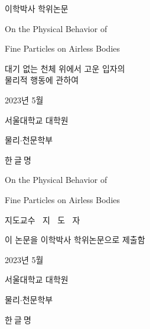 \def\tTitleA{{On the Physical Behavior of}}
\def\tTitleB{{Fine Particles on Airless Bodies}}
\def\tTitleK{{대기 없는 천체 위에서 고운 입자의 \\물리적 행동에 관하여}}
\def\tDepartment{{물리$\cdot$천문학부}}
\def\tDate{{2023년 5월}}
\def\tName{{한글명}}
\def\tNameWithBlank{{한$ \ $글$ \ $명}}

\renewcommand{\baselinestretch}{1}
\centering
{\Large \quad \par}
\vspace{.5cm}
{\Large 이학박사 학위논문 \par}
\vspace{2cm}
{\Huge \tTitleA \par}
\vspace{.3cm}
{\Huge \tTitleB \par}
\vspace{2cm}
{\LARGE \tTitleK \par}
\vspace{4.5cm}
{\Large \tDate \par}
\vspace{3cm}
{\LARGE 서울대학교 대학원 \par}
\vspace{.5cm}
{\Large \tDepartment \par}
\vspace{.5cm}
{\LARGE \tNameWithBlank \par}

\clearpage

\centering
{\Large \quad \par}
\vspace{.1cm}
{\Huge \tTitleA \par}
\vspace{.3cm}
{\Huge \tTitleB \par}
\vspace{1.5cm}
{\LARGE 지도교수 $\ $ 지 $\ $ 도 $ \ $ 자 \par}
\vspace{1cm}
{\LARGE 이 논문을 이학박사 학위논문으로 제출함 \par}
\vspace{.2cm}
{\Large \tDate \par}

\vspace{.9cm}
{\LARGE 서울대학교 대학원 \par}
\vspace{.3cm}
{\Large \tDepartment \par}
\vspace{.3cm}
{\LARGE \tNameWithBlank \par}
\vspace{.9cm}

